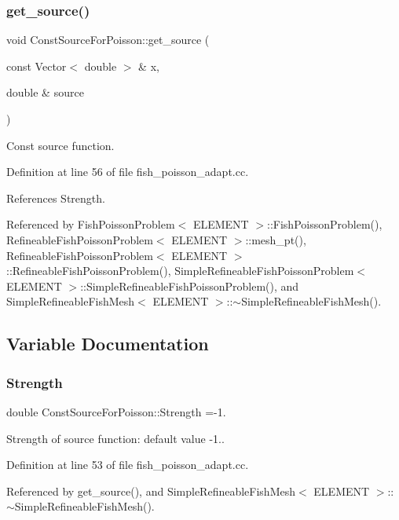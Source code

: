 \subsubsection{\texorpdfstring{get\+\_\+source()}{get\_source()}}
{\footnotesize\ttfamily void Const\+Source\+For\+Poisson\+::get\+\_\+source (\begin{DoxyParamCaption}\item[{const Vector$<$ double $>$ \&}]{x,  }\item[{double \&}]{source }\end{DoxyParamCaption})}



Const source function. 



Definition at line 56 of file fish\+\_\+poisson\+\_\+adapt.\+cc.



References Strength.



Referenced by Fish\+Poisson\+Problem$<$ E\+L\+E\+M\+E\+N\+T $>$\+::\+Fish\+Poisson\+Problem(), Refineable\+Fish\+Poisson\+Problem$<$ E\+L\+E\+M\+E\+N\+T $>$\+::mesh\+\_\+pt(), Refineable\+Fish\+Poisson\+Problem$<$ E\+L\+E\+M\+E\+N\+T $>$\+::\+Refineable\+Fish\+Poisson\+Problem(), Simple\+Refineable\+Fish\+Poisson\+Problem$<$ E\+L\+E\+M\+E\+N\+T $>$\+::\+Simple\+Refineable\+Fish\+Poisson\+Problem(), and Simple\+Refineable\+Fish\+Mesh$<$ E\+L\+E\+M\+E\+N\+T $>$\+::$\sim$\+Simple\+Refineable\+Fish\+Mesh().



\subsection{Variable Documentation}
\mbox{\label{namespaceConstSourceForPoisson_add351c5acab2561d68d1fc9ec3d5fc5e}} 
\subsubsection{\texorpdfstring{Strength}{Strength}}
{\footnotesize\ttfamily double Const\+Source\+For\+Poisson\+::\+Strength =-\/1.}



Strength of source function\+: default value -\/1.. 



Definition at line 53 of file fish\+\_\+poisson\+\_\+adapt.\+cc.



Referenced by get\+\_\+source(), and Simple\+Refineable\+Fish\+Mesh$<$ E\+L\+E\+M\+E\+N\+T $>$\+::$\sim$\+Simple\+Refineable\+Fish\+Mesh().


